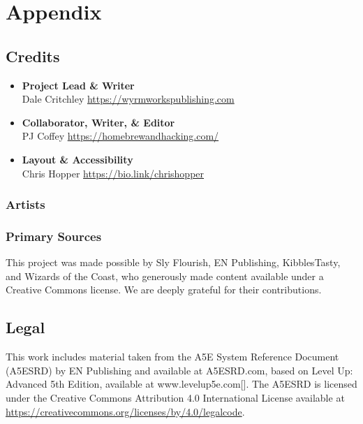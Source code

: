 \section{Appendix}\label{PlayersGuide_appendix}

\subsection{Credits}\label{Credits_credits}

\begin{itemize}
\item
  \textbf{Project Lead \& Writer}\\
  Dale Critchley \url{https://wyrmworkspublishing.com}
\item
  \textbf{Collaborator, Writer, \& Editor}\\
  PJ Coffey \url{https://homebrewandhacking.com/}
\item
  \textbf{Layout \& Accessibility}\\
  Chris Hopper \url{https://bio.link/chrishopper}
\end{itemize}

\subsubsection{Artists}\label{Credits_artists}

\subsubsection{Primary Sources}\label{Credits_primary-sources}

This project was made possible by Sly Flourish, EN Publishing,
KibblesTasty, and Wizards of the Coast, who generously made content
available under a Creative Commons license. We are deeply grateful for
their contributions.

\subsection{Legal}\label{Legal_legal}

This work includes material taken from the A5E System Reference Document
(A5ESRD) by EN Publishing and available at A5ESRD.com, based on Level
Up: Advanced 5th Edition, available at www.levelup5e.com{[}{]}. The
A5ESRD is licensed under the Creative Commons Attribution 4.0
International License available at
\url{https://creativecommons.org/licenses/by/4.0/legalcode}.

